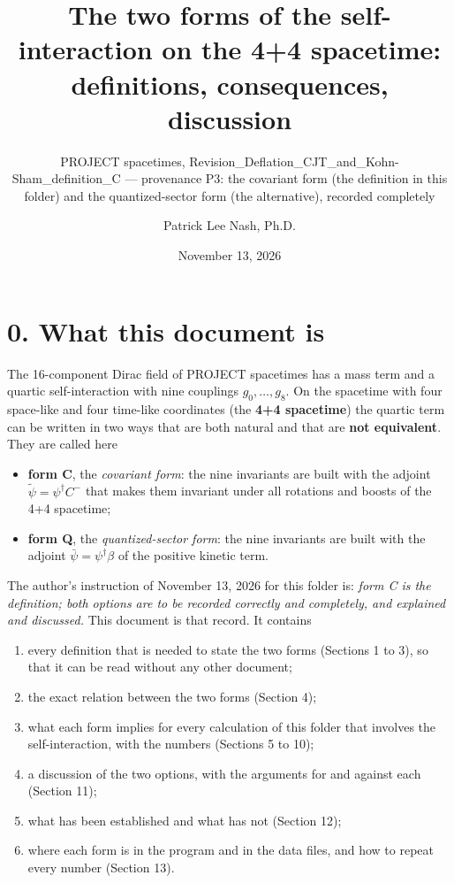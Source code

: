 \documentclass[
  10pt,
]{article}
\title{The two forms of the self-interaction on the 4+4 spacetime:
definitions, consequences, discussion}
\subtitle{PROJECT spacetimes,
Revision\_Deflation\_CJT\_and\_Kohn-Sham\_definition\_C --- provenance
P3: the covariant form (the definition in this folder) and the
quantized-sector form (the alternative), recorded completely}
\author{Patrick Lee Nash, Ph.D.}
\date{November 13, 2026}
\providecommand{\tightlist}{%
  \setlength{\itemsep}{0pt}\setlength{\parskip}{0pt}}
\begin{document}
\maketitle

\hypertarget{what-this-document-is}{%
\section{0. What this document is}\label{what-this-document-is}}

The 16-component Dirac field of PROJECT spacetimes has a mass term and a
quartic self-interaction with nine couplings \(g_0,\dots,g_8\). On the
spacetime with four space-like and four time-like coordinates (the
\textbf{4+4 spacetime}) the quartic term can be written in two ways that
are both natural and that are \textbf{not equivalent}. They are called
here

\begin{itemize}
\tightlist
\item
  \textbf{form C}, the \emph{covariant form}: the nine invariants are
  built with the adjoint \(\tilde\psi=\psi^\dagger C^-\) that makes them
  invariant under all rotations and boosts of the 4+4 spacetime;
\item
  \textbf{form Q}, the \emph{quantized-sector form}: the nine invariants
  are built with the adjoint \(\bar\psi=\psi^\dagger\beta\) of the
  positive kinetic term.
\end{itemize}

The author's instruction of November 13, 2026 for this folder is:
\emph{form C is the definition; both options are to be recorded
correctly and completely, and explained and discussed.} This document is
that record. It contains

\begin{enumerate}
\def\labelenumi{\arabic{enumi}.}
\tightlist
\item
  every definition that is needed to state the two forms (Sections 1 to
  3), so that it can be read without any other document;
\item
  the exact relation between the two forms (Section 4);
\item
  what each form implies for every calculation of this folder that
  involves the self-interaction, with the numbers (Sections 5 to 10);
\item
  a discussion of the two options, with the arguments for and against
  each (Section 11);
\item
  what has been established and what has not (Section 12);
\item
  where each form is in the program and in the data files, and how to
  repeat every number (Section 13).
\end{enumerate}
\end{document}
